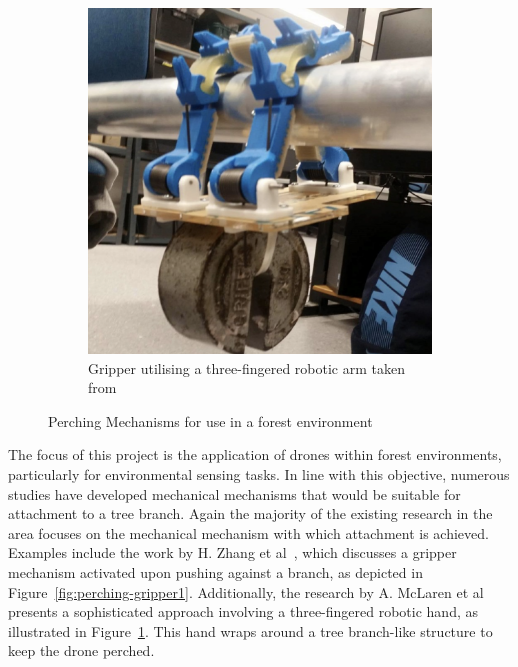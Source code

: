 \begin{figure}[ht]
\begin{subfigure}[b]{0.45\textwidth}
      \includegraphics[width=\textwidth]{background/perching-gripper2.png}
      \caption{Gripper utilising a three-fingered robotic arm taken from~\cite{perching-gripper2}}
      \label{fig:perching-gripper2}
  \end{subfigure}
  \caption{Perching Mechanisms for use in a forest environment}
  \label{fig:perching-grippers}
\end{figure}

The focus of this project is the application of drones within forest environments, particularly for environmental sensing tasks. 
In line with this objective, numerous studies have developed mechanical mechanisms that would be suitable for attachment to a tree branch. 
Again the majority of the existing research in the area focuses on the mechanical mechanism with which attachment is achieved. 
Examples include the work by H. Zhang et al~\cite{perching-gripper1}, which discusses a gripper mechanism activated upon pushing against a branch, as depicted in Figure~\ref{fig:perching-gripper1}. 
Additionally, the research by A. McLaren et al~\cite{perching-gripper2} presents a sophisticated approach involving a three-fingered robotic hand, as illustrated in Figure~\ref{fig:perching-gripper2}.
This hand wraps around a tree branch-like structure to keep the drone perched.


